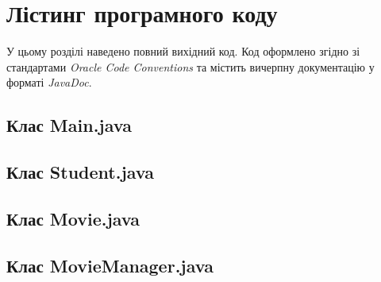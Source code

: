 \section{Лістинг програмного коду}

У цьому розділі наведено повний вихідний код. 
Код оформлено згідно зі стандартами \textit{Oracle Code Conventions} та містить 
вичерпну документацію у форматі \textit{JavaDoc}.
\subsection{Клас Main.java}

\newpage %
\subsection{Клас Student.java}

\newpage %
\subsection{Клас Movie.java}

\newpage %
\subsection{Клас MovieManager.java}
